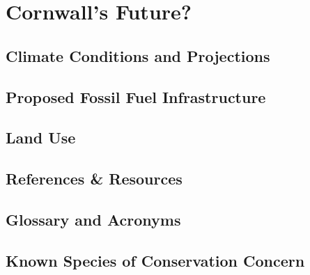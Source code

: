 \documentclass[11pt,fleqn, openany]{book} %
\begin{document}
\part{Cornwall's Future?}
\chapter{Climate Conditions and Projections}\label{sec:climate}


\chapter{Proposed Fossil Fuel Infrastructure}\label{sec:fossil}


\chapter{Land Use}\label{sec:landuse}



\chapter{References \& Resources}
\label{sec:references}
\printbibliography

\chapter{Glossary and Acronyms}\label{subsec:glossary}
\glsaddall
\renewcommand{\glossarysection}[2][]{}
\printglossary

\chapter{Known Species of Conservation Concern}

\end{document}

